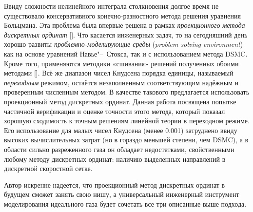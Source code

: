 Ввиду сложности нелинейного интеграла столкновения долгое время не существовало консервативного конечно-разностного метода решения 
уравнения Больцмана. Эта проблема была впервые решена в рамках \textit{проекционного метода дискретных ординат} [].
Что касается инженерных задач, то на сегодняшний день хорошо развиты \textit{проблемно-моделирующие среды} (\textit{problem solving environment})
как на основе уравнений Навье"--~Стокса, так и с использованием метода DSMC.
Кроме того, применяются методики «сшивания» решений полученных обоими методами [].
Всё же диапазон чисел Кнудсена порядка единицы, называемый \textit{переходным} режимом, остаётся незаполненным соответствующим
надёжным и проверенным численным методом. В качестве такового предлагается использовать проекционный метод дискретных ординат.
Данная работа посвящена попытке частичной верификации и оценке точности этого метода,
который показал хорошую сходимость к точным решениям линейной теории в переходном режиме.
Его использование для малых чисел Кнудсена (менее 0.001) затруднено ввиду высоких вычислительных затрат (но в гораздо меньшей степени, чем DSMC),
а в области сильно разреженного газа он обладает недостатками, свойственными любому методу дискретных ординат:
наличию выделенных направлений в дискретной скоростной сетке.

Автор искренне надеется, что проекционный метод дискретных ординат в будущем сможет занять свою нишу,
а универсальный инженерный инструмент моделирования идеального газа будет сочетать все три описанные выше подхода.

